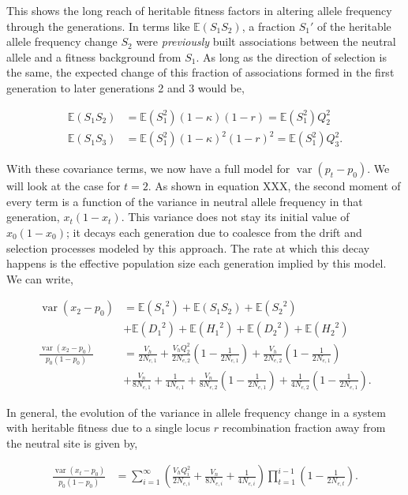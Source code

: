 \documentclass[11pt]{article}
\newcommand{\E}{\mathbb{E}}
\DeclareMathOperator{\var}{var}
\begin{document}
This shows the long reach of heritable fitness factors in altering allele
frequency through the generations. In terms like $\E(S_1 S_2)$, a fraction
$S_1'$ of the heritable allele frequency change $S_2$ were \emph{previously}
built associations between the neutral allele and a fitness background from
$S_1$. As long as the direction of selection is the same, the expected change
of this fraction of associations formed in the first generation to later
generations 2 and 3 would be,

\begin{align}
  \E(S_1 S_2) &= \E(S_1^2) (1-\kappa)(1-r) = \E(S_1^2) Q_2^2 \\
  \E(S_1 S_3) &= \E(S_1^2) (1-\kappa)^2(1-r)^2 = \E(S_1^2) Q_3^2.
\end{align}

With these covariance terms, we now have a full model for $\var(p_t - p_0)$. We
will look at the case for $t=2$. As shown in equation XXX, the second moment of
every term is a function of the variance in neutral allele frequency in that
generation, $x_t(1-x_t)$. This variance does not stay its initial value of
$x_0(1-x_0)$; it decays each generation due to coalesce from the drift and
selection processes modeled by this approach. The rate at which this decay
happens is the effective population size each generation implied by this model. 
We can write,

\begin{align}
  \var(x_2 - p_0) &= \E({S_1}^2) + \E(S_1 S_2) + \E({S_2}^2) \\
                  & + \E({D_1}^2) + \E({H_1}^2) + \E({D_2}^2) + \E({H_2}^2) \\
  \frac{\var(x_2 - p_0)}{p_0(1-p_0)} &= \frac{V_h}{2N_{e,1}} + \frac{V_h Q_2^2}{2N_{e,2}}\left(1-\frac{1}{2N_{e,1}}\right)  +  \frac{V_h}{2N_{e,2}}  \left(1-\frac{1}{2N_{e,1}}\right)  \\ 
                                     &+ \frac{V_n}{8N_{e,1}} + \frac{1}{4N_{e,1}} + \frac{V_n}{8N_{e,2}}  \left(1 - \frac{1}{2N_{e,1}}\right) 
+ \frac{1}{4N_{e,2}} \left(1 - \frac{1}{2N_{e,1}}\right).
\end{align}

In general, the evolution of the variance in allele frequency change in a
system with heritable fitness due to a single locus $r$ recombination fraction
away from the neutral site is given by,

\begin{align}
  \label{eqn:var_xt}
  \frac{\var(x_t - p_0)}{p_0(1-p_0)} &= \sum_{i=1}^\infty \left(\frac{V_h Q_i^2}{2 N_{e,i}} + \frac{V_n}{8N_{e,i}} + \frac{1}{4N_{e,i}} \right)\prod_{t=1}^{i-1} \left(1-\frac{1}{2 N_{e,t}}\right). \\
\end{align}
\end{document}
